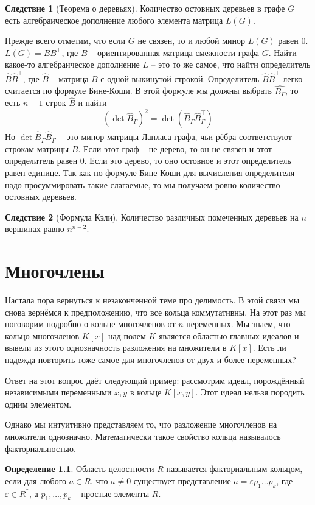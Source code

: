 \documentclass[12pt,a4paper,oneside]{book}
\theoremstyle{definition}
\newtheorem*{defn}{\color{yellow!30!red} Определение}
\newtheorem{cor}{\color{green!45!black}Следствие}
\def\eps{\varepsilon}
\def\dfn{\begin{defn}}
\def\edfn{\end{defn}}
\def\crl{\begin{cor}}
\def\ecrl{\end{cor}}
\begin{document}
\crl[Теорема о деревьях] Количество остовных деревьев в графе $G$ есть алгебраическое дополнение любого элемента матрица $L(G)$.
\ecrl
\proof Прежде всего отметим, что если $G$ не связен, то и любой минор $L(G)$ равен $0$. $L(G)=BB^\top$, где $B$ -- ориентированная матрица смежности графа $G$. Найти какое-то алгебраическое дополнение $L$ -- это то же самое, что найти определитель $\hat{B}\hat{B}^\top$, где $\hat{B}$ -- матрица $B$ с одной выкинутой строкой. Определитель $\hat B \hat{B}^\top$ легко считается по формуле Бине-Коши. В этой формуле мы должны выбрать $\hat{B_{\Gamma}}$, то есть $n-1$ строк $\hat{B}$ и найти
$$(\det \hat{B}_{\Gamma})^2=\det(\hat{B}_{\Gamma} \hat{B}_{\Gamma}^\top)$$
Но $\det \hat{B}_{\Gamma} \hat{B}_{\Gamma}^\top$ -- это минор матрицы Лапласа графа, чьи рёбра соответствуют строкам матрицы $B$. Если этот граф  -- не дерево, то он не связен и этот определитель равен $0$. Если это дерево, то оно остовное и этот определитель равен единице. Так как по формуле Бине-Коши для вычисления определителя надо просуммировать такие слагаемые, то мы получаем ровно количество остовных деревьев.
\endproof


\crl[Формула Кэли] Количество различных помеченных деревьев на $n$ вершинах равно $n^{n-2}$.
\ecrl


\chapter{Многочлены}

Настала пора вернуться к незаконченной теме про делимость. В этой связи мы снова вернёмся к предположению, что все кольца коммутативны. На этот раз мы поговорим подробно о кольце многочленов от $n$ переменных. Мы знаем, что кольцо многочленов $K[x]$ над полем $K$ является областью главных идеалов и вывели из этого однозначность разложения на множители в $K[x]$. Есть ли надежда повторить тоже самое для многочленов от двух и более переменных? 

Ответ на этот вопрос даёт следующий пример: рассмотрим идеал, порождённый независимыми переменными $x,y$ в кольце $K[x,y]$. Этот идеал нельзя породить одним элементом.

Однако мы интуитивно представляем то, что разложение многочленов на множители однозначно. Математически такое свойство кольца называлось факториальностью.

\dfn
Область целостности $R$ называется факториальным кольцом, если для любого $a\in R$, что $a\neq 0$  существует представление $a=\eps p_1\dots p_k$, где $\eps \in R^*$, а $p_1,\dots,p_k$ -- простые элементы $R$.
\edfn
\end{document}
